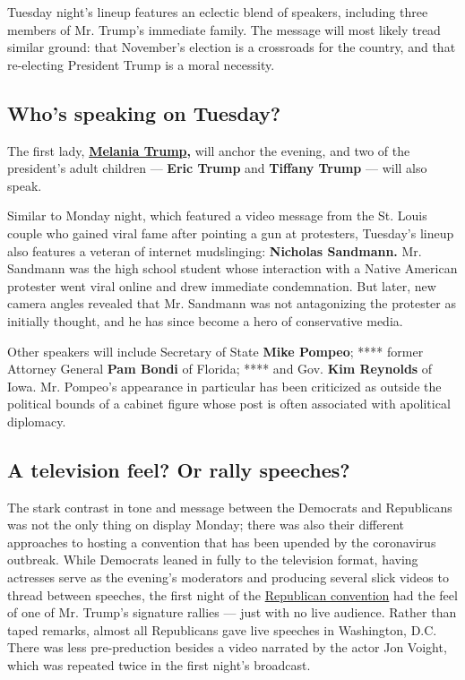 Tuesday night's lineup features an eclectic blend of speakers, including
three members of Mr. Trump's immediate family. The message will most
likely tread similar ground: that November's election is a crossroads
for the country, and that re-electing President Trump is a moral
necessity.

\hypertarget{whos-speaking-on-tuesday}{%
\subsection{Who's speaking on Tuesday?}\label{whos-speaking-on-tuesday}}

The first lady,
\textbf{\href{https://www.nytimes3xbfgragh.onion/2020/08/26/style/melania-trump-republican-national-convention.html}{Melania
Trump},} will anchor the evening, and two of the president's adult
children --- \textbf{Eric Trump} and \textbf{Tiffany Trump} --- will
also speak.

Similar to Monday night, which featured a video message from the St.
Louis couple who gained viral fame after pointing a gun at protesters,
Tuesday's lineup also features a veteran of internet mudslinging:
\textbf{Nicholas Sandmann.} Mr. Sandmann was the high school student
whose interaction with a Native American protester went viral online and
drew immediate condemnation. But later, new camera angles revealed that
Mr. Sandmann was not antagonizing the protester as initially thought,
and he has since become a hero of conservative media.

Other speakers will include Secretary of State \textbf{Mike Pompeo};
**** former Attorney General \textbf{Pam Bondi} of Florida; **** and
Gov. \textbf{Kim Reynolds} of Iowa. Mr. Pompeo's appearance in
particular has been criticized as outside the political bounds of a
cabinet figure whose post is often associated with apolitical diplomacy.

\hypertarget{a-television-feel-or-rally-speeches}{%
\subsection{A television feel? Or rally
speeches?}\label{a-television-feel-or-rally-speeches}}

The stark contrast in tone and message between the Democrats and
Republicans was not the only thing on display Monday; there was also
their different approaches to hosting a convention that has been upended
by the coronavirus outbreak. While Democrats leaned in fully to the
television format, having actresses serve as the evening's moderators
and producing several slick videos to thread between speeches, the first
night of the
\href{https://www.nytimes3xbfgragh.onion/live/2020/08/27/us/rnc-convention-election}{Republican
convention} had the feel of one of Mr. Trump's signature rallies ---
just with no live audience. Rather than taped remarks, almost all
Republicans gave live speeches in Washington, D.C. There was less
pre-preduction besides a video narrated by the actor Jon Voight, which
was repeated twice in the first night's broadcast.

